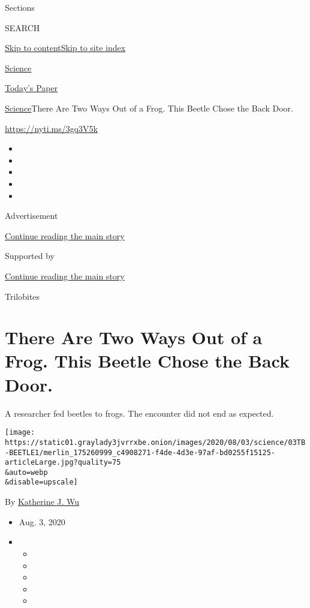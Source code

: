 Sections

SEARCH

\protect\hyperlink{site-content}{Skip to
content}\protect\hyperlink{site-index}{Skip to site index}

\href{https://www.nytimes3xbfgragh.onion/section/science}{Science}

\href{https://myaccount.nytimes3xbfgragh.onion/auth/login?response_type=cookie\&client_id=vi}{}

\href{https://www.nytimes3xbfgragh.onion/section/todayspaper}{Today's
Paper}

\href{/section/science}{Science}\textbar{}There Are Two Ways Out of a
Frog. This Beetle Chose the Back Door.

\url{https://nyti.ms/3gq3V5k}

\begin{itemize}
\item
\item
\item
\item
\item
\end{itemize}

Advertisement

\protect\hyperlink{after-top}{Continue reading the main story}

Supported by

\protect\hyperlink{after-sponsor}{Continue reading the main story}

Trilobites

\hypertarget{there-are-two-ways-out-of-a-frog-this-beetle-chose-the-back-door}{%
\section{There Are Two Ways Out of a Frog. This Beetle Chose the Back
Door.}\label{there-are-two-ways-out-of-a-frog-this-beetle-chose-the-back-door}}

A researcher fed beetles to frogs. The encounter did not end as
expected.

\texttt{[image: https://static01.graylady3jvrrxbe.onion/images/2020/08/03/science/03TB-BEETLE1/merlin\_175260999\_c4908271-f4de-4d3e-97af-bd0255f15125-articleLarge.jpg?quality=75\\\&auto=webp\\\&disable=upscale]}

By
\href{https://www.nytimes3xbfgragh.onion/by/katherine-j--wu}{Katherine
J. Wu}

\begin{itemize}
\item
  Aug. 3, 2020
\item
  \begin{itemize}
  \item
  \item
  \item
  \item
  \item
  \end{itemize}
\end{itemize}

